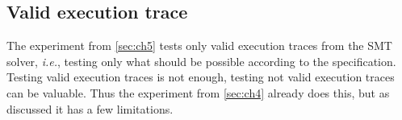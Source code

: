 \subsection*{Valid execution trace}
The experiment from \autoref{sec:ch5} tests only valid execution traces from
the SMT solver, \textit{i.e.}, testing only what should be possible according to
the specification. Testing valid execution traces is not enough, testing not
valid execution traces can be valuable. Thus the experiment from
\autoref{sec:ch4} already does this, but as discussed it has a few limitations.
